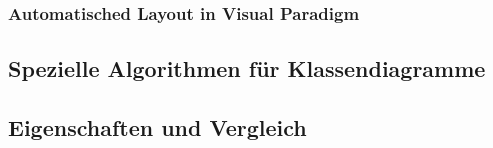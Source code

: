 


\subsubsection{Automatisched Layout in Visual Paradigm}



\subsection{Spezielle Algorithmen für Klassendiagramme}







\subsection{Eigenschaften und Vergleich}



